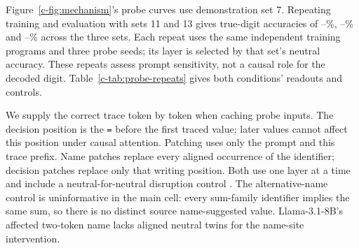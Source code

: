 Figure~\ref{c-fig:mechanism}'s probe curves use demonstration set 7. Repeating training and evaluation with sets 11 and 13
gives true-digit accuracies of --\%,
--\% and
--\% across the three sets. Each repeat
uses the same independent training programs and three probe seeds; its layer is selected by
that set's neutral accuracy. These repeats assess prompt sensitivity, not a causal role for
the decoded digit. Table~\ref{c-tab:probe-repeats} gives both conditions' readouts and controls.

\begin{table}[t]
\centering\small

\caption{Disjoint code probes, three demonstration sets. Neutral and misleading are
true-digit accuracy; each control column gives name-identity accuracy for that condition.
Majority predicts the most frequent digit in training on the misleading test programs.
Rates are percentages, averaged over three probe seeds. Layers are selected by neutral accuracy.}
\label{c-tab:probe-repeats}
\end{table}

We supply the correct trace token by token when caching probe inputs. The decision position is the \texttt{=} before the
first traced value; later values cannot affect this position under causal attention. Patching
uses only the prompt and this trace prefix. Name patches replace every aligned
occurrence of the identifier; decision patches replace only that writing position. Both use
one layer at a time and include a neutral-for-neutral disruption control
\cite{zhang2024patching}. The alternative-name control is uninformative in the main cell:
every sum-family identifier implies the same sum, so there is no distinct source name-suggested value.
Llama-3.1-8B's affected two-token name lacks aligned neutral twins for the name-site intervention.


\begin{table}[t]
\centering\small

\caption{Layers behind Figure~\ref{c-fig:mechanism}. Name tokens: name errors removed by
replacing every token of the name at layer 0, damage to correct instances, and the first
layer after which removal falls below 10\%. Decision token: first layer at which a
single-layer replacement removes 50\% and 90\% of name errors, removal with every layer
replaced, and its damage. Llama-3.1-8B's name errors fall on a two-token name without a
token-aligned twin.}
\label{c-tab:patch}
\end{table}

